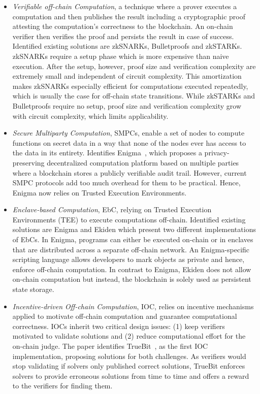 \begin{itemize}
  \item \textit{Verifiable off-chain Computation}, a technique where a prover executes a computation and then publishes the result including a cryptographic proof attesting the computation’s correctness to the blockchain. An on-chain verifier then verifies the proof and persists the result in case of success. Identified existing solutions are zkSNARKs, Bulletproofs and zkSTARKs. zkSNARKs require a setup phase which is more expensive than naive execution. After the setup, however, proof size and verification complexity are extremely small and independent of circuit complexity. This amortization makes zkSNARKs especially efficient for computations executed repeatedly, which is usually the case for off-chain state transitions. While zkSTARKs and Bulletproofs require no setup, proof size and verification complexity grow with circuit complexity, which limits applicability.
  \item \textit{Secure Multiparty Computation}, SMPCs, enable a set of nodes to compute functions on secret data in a way that none of the nodes ever has access to the data in its entirety. Identifies Enigma~\citet{Tam2018}, which proposes a privacy-preserving decentralized computation platform based on multiple parties where a blockchain stores a publicly verifiable audit trail. However, current SMPC protocols add too much overhead for them to be practical. Hence, Enigma now relies on Trusted Execution Environments.

  \item \textit{Enclave-based Computation}, EbC, relying on Trusted Execution Environments (TEE) to execute computations off-chain. Identified existing solutions are Enigma and Ekiden \citet{Cheng2018} which present two different implementations of EbCs. In Enigma, programs can either be executed on-chain or in enclaves that are distributed across a separate off-chain network. An Enigma-specific scripting language allows developers to mark objects as private and hence, enforce off-chain computation. In contrast to Enigma, Ekiden does not allow on-chain computation but instead, the blockchain is solely used as persistent state storage.


  \item \textit{Incentive-driven Off-chain Computation}, IOC, relies on incentive mechanisms applied to motivate off-chain computation and guarantee computational correctness. IOCs inherit two critical design issues: (1) keep verifiers motivated to validate solutions and (2) reduce computational effort for the on-chain judge. The paper identifies TrueBit~\citet{Teutsch2017}, as the first IOC implementation, proposing solutions for both challenges. As verifiers would stop validating if solvers only published correct solutions, TrueBit enforces solvers to provide erroneous solutions from time to time and offers a reward to the verifiers for finding them.


\end{itemize}



